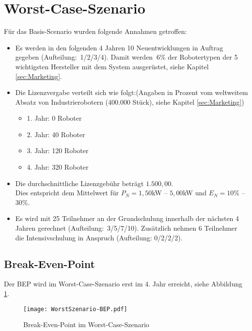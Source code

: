 \section{Worst-Case-Szenario}
Für das Basis-Scenario wurden folgende Annahmen getroffen:
\begin{itemize}
	\item Es werden in den folgenden 4 Jahren 10 Neuentwicklungen in Auftrag gegeben (Aufteilung:~1/2/3/4). Damit werden $~6$\% der Robotertypen der 5 wichtigsten Hersteller mit dem System ausgerüstet, siehe Kapitel \ref{sec:Marketing}.
	\item Die Lizenzvergabe verteilt sich wie folgt:\newline (Angaben in Prozent vom weltweitem Absatz von Industrierobotern ($400.000$ Stück), siehe Kapitel \ref{sec:Marketing})
	\begin{itemize}
		\item 1. Jahr: 0 Roboter
		\item 2. Jahr: 40 Roboter
		\item 3. Jahr: 120 Roboter
		\item 4. Jahr: 320 Roboter
	\end{itemize}
	\item Die durchschnittliche Lizenzgebühr beträgt $1.500,00$\officialeuro.\\ Dies entspricht dem Mittelwert für $P_N = 1,50$kW -- $5,00$kW und $E_N = 10$\% -- $30$\%.
	\item Es wird mit 25 Teilnehmer an der Grundschulung innerhalb der nächsten 4 Jahren gerechnet (Aufteilung:~3/5/7/10). Zusätzlich nehmen 6 Teilnehmer die Intensivschulung in Anspruch (Aufteilung: 0/2/2/2).
\end{itemize}

\subsection{Break-Even-Point}
Der BEP wird im Worst-Case-Szenario erst im 4. Jahr erreicht, siehe Abbildung \ref{fig:WorstSzenario-BEP}.
\begin{figure}[h]
	\centering
	\texttt{[image: WorstSzenario-BEP.pdf]}
	\caption{Break-Even-Point im Worst-Case-Szenario}
	\label{fig:WorstSzenario-BEP}
\end{figure}

